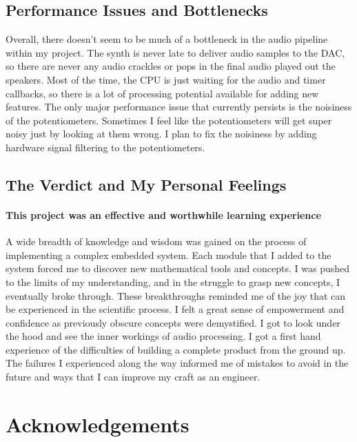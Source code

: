 \documentclass[acmlarge,screen]{acmart}
\begin{document}
	\subsection{Performance Issues and Bottlenecks}
	Overall, there doesn't seem to be much of a bottleneck in the audio pipeline within my project. The synth is never late to deliver audio samples to the DAC, so there are never any audio crackles or pops in the final audio played out the speakers. Most of the time, the CPU is just waiting for the audio and timer callbacks, so there is a lot of processing potential available for adding new features. The only major performance issue that currently persists is the noisiness of the potentiometers. Sometimes I feel like the potentiometers will get super noisy just by looking at them wrong. I plan to fix the noisiness by adding hardware signal filtering to the potentiometers.
	
	\subsection{The Verdict and My Personal Feelings}
	\paragraph{This project was an effective and worthwhile learning experience} A wide breadth of knowledge and wisdom was gained on the process of implementing a complex embedded system. Each module that I added to the system forced me to discover new mathematical tools and concepts. I was pushed to the limits of my understanding, and in the struggle to grasp new concepts, I eventually broke through. These breakthroughs reminded me of the joy that can be experienced in the scientific process. I felt a great sense of empowerment and confidence as previously obscure concepts were demystified. I got to look under the hood and see the inner workings of audio processing. I got a first hand experience of the difficulties of building a complete product from the ground up. The failures I experienced along the way informed me of mistakes to avoid in the future and ways that I can improve my craft as an engineer.

\section{Acknowledgements}
\end{document}

